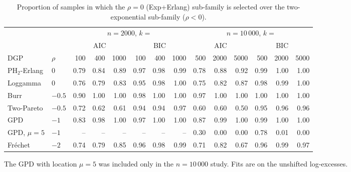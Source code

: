 \begin{table}[t]
\centering
\footnotesize
\setlength{\tabcolsep}{4pt}
\caption{Proportion of samples in which the $\rho=0$ (Exp+Erlang) sub-family is selected over the two-exponential sub-family ($\rho<0$).}
\label{tab:share}
\begin{tabular}{llrrrrrrrrrrrr}
\toprule
 & & \multicolumn{6}{c}{$n=2000$, $k=$} & \multicolumn{6}{c}{$n=10\,000$, $k=$} \\
\cmidrule(lr){3-8} \cmidrule(lr){9-14}
 & & \multicolumn{3}{c}{AIC} & \multicolumn{3}{c}{BIC} & \multicolumn{3}{c}{AIC} & \multicolumn{3}{c}{BIC} \\
\cmidrule(lr){3-5} \cmidrule(lr){6-8} \cmidrule(lr){9-11} \cmidrule(lr){12-14}
DGP & $\rho$ & 100 & 400 & 1000 & 100 & 400 & 1000 & 500 & 2000 & 5000 & 500 & 2000 & 5000 \\
\midrule
PH$_2$-Erlang & $0$ & 0.79 & 0.84 & 0.89 & 0.97 & 0.98 & 0.99 & 0.78 & 0.88 & 0.92 & 0.99 & 1.00 & 1.00 \\
Loggamma & $0$ & 0.76 & 0.79 & 0.83 & 0.95 & 0.98 & 1.00 & 0.75 & 0.82 & 0.87 & 0.98 & 0.99 & 1.00 \\
Burr & $-0.5$ & 0.90 & 1.00 & 1.00 & 0.98 & 1.00 & 1.00 & 0.97 & 1.00 & 1.00 & 1.00 & 1.00 & 1.00 \\
Two-Pareto & $-0.5$ & 0.72 & 0.62 & 0.61 & 0.94 & 0.94 & 0.97 & 0.60 & 0.60 & 0.50 & 0.95 & 0.96 & 0.96 \\
GPD & $-1$ & 0.83 & 0.98 & 1.00 & 0.97 & 1.00 & 1.00 & 0.87 & 0.99 & 1.00 & 0.99 & 1.00 & 1.00 \\
GPD, $\mu=5$ & $-1$ & -- & -- & -- & -- & -- & -- & 0.30 & 0.00 & 0.00 & 0.78 & 0.01 & 0.00 \\
Fr\'echet & $-2$ & 0.74 & 0.79 & 0.85 & 0.96 & 0.98 & 0.99 & 0.71 & 0.82 & 0.67 & 0.96 & 0.99 & 0.97 \\
\bottomrule
\end{tabular}
\par\smallskip
\parbox{\linewidth}{\footnotesize The GPD with location $\mu=5$ was included only in the $n=10\,000$ study. Fits are on the unshifted log-excesses.}
\end{table}
